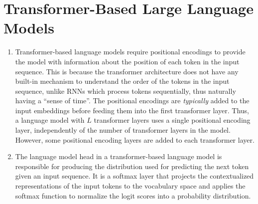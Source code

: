\documentclass[11pt,a4paper]{article}
\begin{document}
\section{Transformer-Based Large Language Models}

\begin{enumerate}[label=(\alph*)]
    \item Transformer-based language models require positional encodings to
          provide the model with information about the position of each token in
          the input sequence.
          This is because the transformer architecture does not have any
          built-in mechanism to understand the order of the tokens in the input
          sequence, unlike RNNs which process tokens sequentially, thus
          naturally having a ``sense of time''.
          The positional encodings are \emph{typically} added to the input
          embeddings before feeding them into the first transformer layer.
          Thus, a language model with $L$ transformer layers uses a single
          positional encoding layer, independently of the number of transformer
          layers in the model.
          However, some positional encoding layers are added to each transformer 
          layer.
    \item The language model head in a transformer-based language model is
          responsible for producing the distribution used for predicting the
          next token given an input sequence.
          It is a softmax layer that projects the contextualized representations
          of the input tokens to the vocabulary space and applies the softmax
          function to normalize the logit scores into a probability
          distribution.


\end{enumerate}
\end{document}
